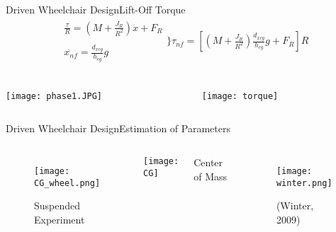 \documentclass[10pt]{beamer}
\begin{document}
\begin{frame}{Driven Wheelchair Design}{Lift-Off Torque}
\begin{eqnarray*}
\begin{matrix}
	\frac{\tau}{R} = \left( M + \frac{J_R}{R^2} \right)\ddot{x} + F_R \\
	\\
	\ddot{x_{nf}} = \frac{d_{xcg}}{h_{cg}}g
\end{matrix} \Bigg\}
	\tau_{nf} = \left[ \left( M + \frac{J_R}{R^2} \right)\frac{d_{xcg}}{h_{cg}}g + F_R \right]R \\
\end{eqnarray*}   

\begin{columns}[T] %
\begin{column}{.4\textwidth}
  \centering
  \texttt{[image: phase1.JPG]}
\end{column}%
\hfill%
\begin{column}{.70\textwidth}
  \centering
  \texttt{[image: torque]}
\end{column}%
\end{columns}
\end{frame}

\begin{frame}{Driven Wheelchair Design}{Estimation of Parameters}
\begin{columns}
\begin{minipage}[c][0.4\textheight][c]{\linewidth}
  \begin{figure}
  \texttt{[image: CG\_wheel.png]}
  \caption{Suspended Experiment}
  \end{figure}
\end{minipage}
\begin{minipage}[c][0.4\textheight][c]{\linewidth}
  \centering
  \texttt{[image: CG]}
\end{minipage}
\begin{minipage}[c][0.1\textheight][c]{\linewidth}
	\centering
		Center of Mass
\end{minipage}
\begin{minipage}[c][0.6\textheight][c]{\linewidth}
  \centering
  \begin{figure}
  \texttt{[image: winter.png]}
  \caption{(Winter, 2009)}
  \end{figure}
\end{minipage}
\end{columns}
\end{frame}
\end{document}
